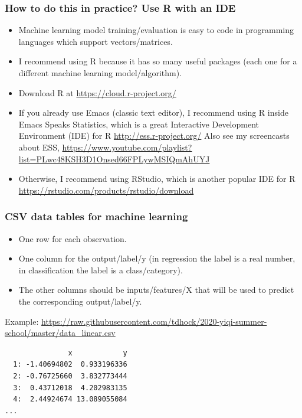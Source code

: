 \documentclass{beamer}
\begin{document}
\begin{frame}
  \frametitle{How to do this in practice? Use R with an IDE}
  \begin{itemize}
  \item Machine learning model training/evaluation is easy to code in
    programming languages which support vectors/matrices.
  \item I recommend using R because it has so many useful packages
    (each one for a different machine learning model/algorithm).
  \item Download R at \url{https://cloud.r-project.org/}
  \item If you already use Emacs (classic text editor), I recommend
    using R inside Emacs Speaks Statistics, which is a great
    Interactive Development Environment (IDE) for R
    \url{http://ess.r-project.org/} Also see my screencasts about ESS,
    \url{https://www.youtube.com/playlist?list=PLwc48KSH3D1Onsed66FPLywMSIQmAhUYJ}
  \item Otherwise, I recommend using RStudio, which is another popular
    IDE for R
    \url{https://rstudio.com/products/rstudio/download}
  \end{itemize}
\end{frame}

\begin{frame}[fragile]
  \frametitle{CSV data tables for machine learning}
  \begin{itemize}
  \item One row for each observation.
  \item One column for the output/label/y (in regression the label is a real
    number, in classification the label is a class/category).
  \item The other columns should be inputs/features/X that will be used
    to predict the corresponding output/label/y.
  \end{itemize}

  Example:
  \url{https://raw.githubusercontent.com/tdhock/2020-yiqi-summer-school/master/data_linear.csv}

\begin{verbatim}
               x            y
  1: -1.40694802  0.933196336
  2: -0.76725660  3.832773444
  3:  0.43712018  4.202983135
  4:  2.44924674 13.089055084
...
\end{verbatim}
\end{frame}
\end{document}
